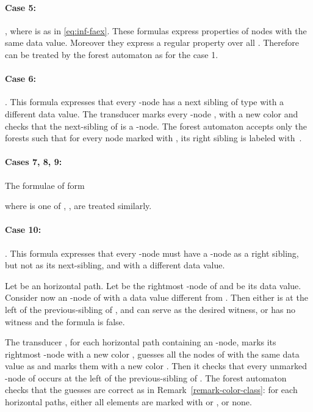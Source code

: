 \documentclass{CSML}
\begin{document}
\paragraph{\bf Case 5:} , where  is as in \eqref{eq:inf-faex}.
These formulas express properties of nodes with the same data value. 
Moreover they express a regular property over all . 
Therefore can be treated by the forest automaton  as for the case 1.



\paragraph{\bf Case 6:}
.
This formula expresses that every -node has a next sibling of type 
with a different data value.
The transducer  marks every -node ,
with a new color  and checks that the next-sibling of  is a -node.
The forest automaton  accepts only the forests such that
for every node marked with , its right sibling is labeled with~.

\paragraph{\bf Cases 7, 8, 9:}
The formulae of form 

where  is one of , ,  
are treated similarly.

\paragraph{\bf Case 10:}
.
This formula expresses that every -node 
must have a -node as a right sibling, but not as its next-sibling,
and with a different data value.

Let  be an horizontal path. Let  be the rightmost -node of  
and  be its data value. 
Consider now an -node  of  with a data value different from . 
Then either  is at the left of the previous-sibling of , 
and  can serve as the desired witness, 
or  has no witness and the formula is false.

The transducer , for each horizontal path  containing an
-node, marks its rightmost -node  with a new color ,
guesses all the nodes of  with the same data value as  and marks them
with a new color . 
Then it checks that every unmarked -node of 
occurs at the left of the previous-sibling of . 
The forest automaton  checks that the guesses are correct 
as in Remark~\ref{remark-color-class}: 
for each horizontal paths, either all elements are marked with  or , or none.
\end{document}

